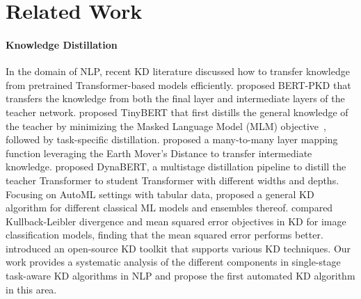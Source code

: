 \documentclass[11pt]{article}
\begin{document}
\section{Related Work}
\label{related work}
\paragraph{Knowledge Distillation}
In the domain of NLP, recent KD literature discussed how to transfer knowledge from pretrained Transformer-based models efficiently. \citep{sun2019patient} proposed BERT-PKD that transfers the knowledge from both the final layer and intermediate layers of the teacher network. \citep{jiao2019tinybert} proposed TinyBERT that first distills the general knowledge of the teacher by minimizing the Masked Language Model (MLM) objective~\citep{devlin2018bert}, followed by task-specific distillation. \citep{li2020bert} proposed a many-to-many layer mapping function leveraging the Earth Mover’s Distance to transfer intermediate knowledge. \citep{hou2020dynabert} proposed DynaBERT, a multistage distillation pipeline to distill the teacher Transformer to student Transformer with different widths and depths. Focusing on AutoML settings with tabular data, \citep{fakoor2020fast} proposed a general KD algorithm for different classical ML models and ensembles thereof.
\citep{kim2021comparing} compared Kullback-Leibler divergence and mean squared error objectives in KD for image classification models, finding that the mean squared error performs better. 
\cite{textbrewer-acl2020-demo} introduced an open-source KD toolkit that supports various KD techniques.
Our work provides a systematic analysis of the different components in  single-stage task-aware KD algorithms in NLP and propose the first automated KD algorithm in this area.
\end{document}
